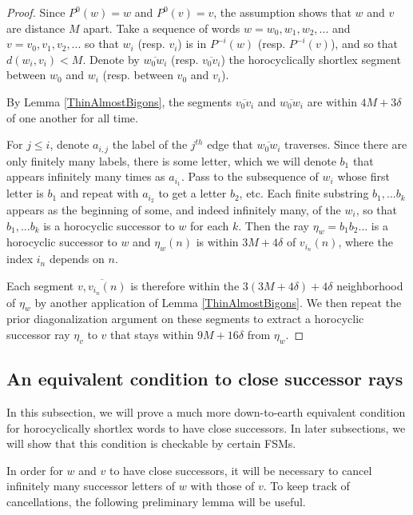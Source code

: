 \documentclass[10pt,a4paper]{amsart}
\theoremstyle{definition}
\theoremstyle{remark}
\begin{document}
	\begin{proof}
		
		Since $P^0(w)=w$ and $P^0(v)=v$, the assumption shows that $w$ and $v$ are distance $M$ apart. Take a sequence of words $w=w_0, w_1, w_2,...$ and $v=v_0, v_1, v_2,...$ so that $w_i$ (resp. $v_i$) is in $P^{-i}(w)$ (resp. $P^{-i}(v)$), and so that $d(w_i, v_i)<M$. Denote  by $\overline{w_0w_i}$ (resp. $\overline{v_0v_i}$) the horocyclically shortlex segment between $w_0$ and $w_i$ (resp. between $v_0$ and $v_i$). 
		
		By Lemma \ref{ThinAlmostBigons}, the segments $\overline{v_0v_i}$ and $\overline{w_0w_i}$ are within  $4M+3\delta$ of one another for all time.
		
		For $j\le i$, denote $a_{i,j}$ the label of the $j^{th}$ edge that $\overline{w_0w_i}$ traverses. Since there are only finitely many labels, there is some letter, which we will denote $b_1$ that appears infinitely many times as $a_{i_1}$. Pass to the subsequence of $w_i$ whose first letter is $b_1$ and repeat with $a_{i_2}$ to get a letter $b_2$, etc. Each finite substring $b_1,...b_k$ appears as the beginning of some, and indeed infinitely many, of the $w_i$, so that $b_1,...b_k$ is a horocyclic successor to $w$ for each $k$. Then the ray $\eta_w=b_1b_2...$ is a horocyclic successor to $w$ and $\eta_w(n)$ is within $3M+4\delta$ of $v_{i_n}(n)$, where the index $i_n$ depends on $n$. 
		
		Each segment $\overline{v,v_{i_n}(n)}$ is therefore within the $3(3M+4\delta)+4\delta$ neighborhood of $\eta_w$ by another application of Lemma \ref{ThinAlmostBigons}. We then repeat the prior diagonalization argument on these segments to extract a horocyclic successor ray $\eta_v$ to $v$ that stays within $9M+16\delta$ from $\eta_w$.
	\end{proof}
	
	\subsection{An equivalent condition to close successor rays}
	\label{subsec:CloseSuccessors}
	
	In this subsection, we will prove a much more down-to-earth equivalent condition for horocyclically shortlex words to have close successors. In later subsections, we will show that this condition is checkable by certain FSMs.
	
	In order for $w$ and $v$ to have close successors, it will be necessary to cancel infinitely many successor letters of $w$ with those of $v$. To keep track of cancellations, the following preliminary lemma will be useful.
	
\end{document}
